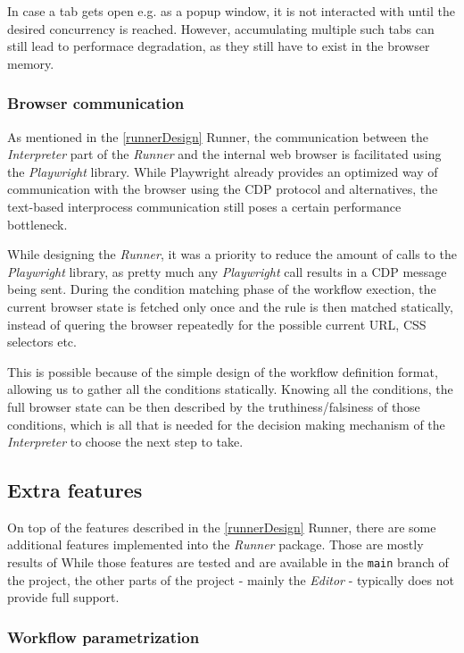 In case a tab gets open e.g. as a popup window, it is not interacted with until the desired concurrency is reached.
However, accumulating multiple such tabs can still lead to performace degradation, as they still have to exist in the browser memory.

\subsubsection{Browser communication} \label{browsercom}
As mentioned in the \autoref{runnerDesign} Runner, the communication between the \textit{Interpreter} part of the \textit{Runner} and the internal web browser is facilitated using the \textit{Playwright} library.
While Playwright already provides an optimized way of communication with the browser using the \acs{CDP} protocol and alternatives, the text-based interprocess communication still poses a certain performance bottleneck.

While designing the \textit{Runner}, it was a priority to reduce the amount of calls to the \textit{Playwright} library, as pretty much any \textit{Playwright} call results in a \acs{CDP} message being sent.
During the condition matching phase of the workflow exection, the current browser state is fetched only once and the rule is then matched statically, instead of quering the browser repeatedly for the possible current URL, CSS selectors etc.

This is possible because of the simple design of the workflow definition format, allowing us to gather all the conditions statically. 
Knowing all the conditions, the full browser state can be then described by the truthiness/falsiness of those conditions, which is all that is needed for the decision making mechanism of the \textit{Interpreter} to choose the next step to take.

\subsection{Extra features}

On top of the features described in the \autoref{runnerDesign} Runner, there are some additional features implemented into the \textit{Runner} package.
Those are mostly results of 
While those features are tested and are available in the \verb|main| branch of the project, the other parts of the project - mainly the \textit{Editor} - typically does not provide full support.

\subsubsection{Workflow parametrization}

